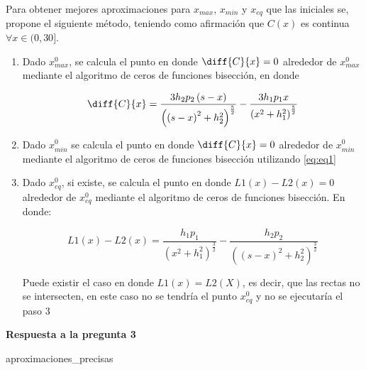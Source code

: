 \documentclass[11pt]{article}
\begin{document}
Para obtener mejores aproximaciones para $x_{max}$, $x_{min}$ y $x_{eq}$ que las iniciales se, propone el siguiente método, teniendo como afirmación que $C(x)$ es continua $\forall x\in(0,30]$.

\begin{enumerate}
    \item Dado $x^0_{max}$, se calcula el punto en donde $\displaystyle \diff{C}{x} = 0$ alrededor de $x^0_{max}$ mediante el algoritmo de ceros de funciones bisección, en donde
    \begin{center}
        \begin{equation}
            \diff{C}{x} = \dfrac{3h_2p_2\left(s-x\right)}{\left(\left(s-x\right)^2+h_2^2\right)^\frac{5}{2}}-\dfrac{3h_1p_1x}{\left(x^2+h_1^2\right)^\frac{5}{2}}\label{eq:eq1}
        \end{equation}
    \end{center}
    \item Dado $x^0_{min}$ se calcula el punto en donde $\displaystyle \diff{C}{x} = 0$ alrededor de $x^0_{min}$ mediante el algoritmo de ceros de funciones bisección utilizando \eqref{eq:eq1}
    
    \item Dado $x^0_{eq}$, si existe, se calcula el punto en donde $\displaystyle L1(x)-L2(x) = 0$ alrededor de $x^0_{eq}$ mediante el algoritmo de ceros de funciones bisección. En donde:
    
    $$ L1(x)-L2(x) =  \dfrac{h_1p_1}{\left(x^2+h_1^2\right)^\frac{3}{2}}-\dfrac{h_2p_2}{\left(\left(s-x\right)^2+h_2^2\right)^\frac{3}{2}}$$
    
    Puede existir el caso en donde $L1(x)=L2(X)$, es decir, que las rectas no se intersecten, en este caso no se tendría el punto $x^0_{eq}$ y no se ejecutaría el paso 3
    
\end{enumerate}

\noindent \textbf{Respuesta a la pregunta 3}
\begin{tcolorbox}[colframe=blue!35!black, title=Códigos pregunta 3]
    aproximaciones\_precisas
\end{tcolorbox}
\end{document}
